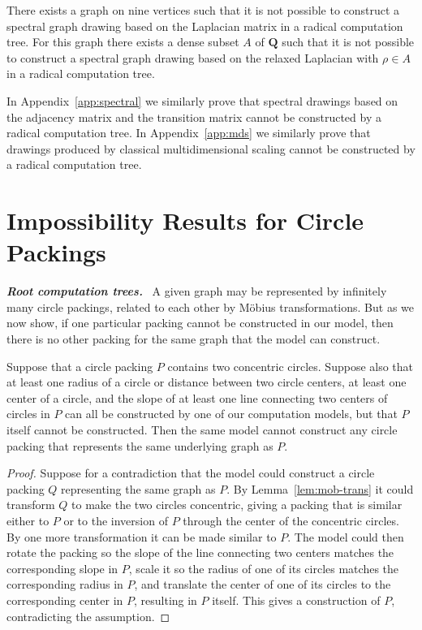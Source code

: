 \documentclass[oribibl,10pt]{llncs}
\newcommand{\rationals}{\mathbf{Q}}
\newcommand{\Emph}[1]{\smallskip\textbf{\textit{#1}}~}
\begin{document}
\begin{theorem}
There exists a graph on nine vertices such that it is not possible to construct a spectral graph drawing based on the Laplacian matrix in a radical computation tree. For this graph there exists a dense subset $A$ of $\rationals$ such that it is not possible to construct a spectral graph drawing based on the relaxed Laplacian with $\rho \in A$ in a radical computation tree.
\end{theorem}

In Appendix~\ref{app:spectral} we similarly prove that spectral drawings based on the adjacency matrix and the transition matrix cannot be constructed by a radical computation tree.  In Appendix~\ref{app:mds} we similarly prove that drawings produced by classical multidimensional scaling cannot be constructed by a radical computation tree.
\section{Impossibility Results for Circle Packings}

\Emph{Root computation trees.} A given graph may be represented by infinitely many circle packings, related to each other by M\"obius transformations. But as we now show, if one particular packing cannot be constructed in our model, then there is no other packing for the same graph that the model can construct.

\begin{lemma}
\label{lem:concentric}
Suppose that a circle packing $P$ contains two concentric circles. Suppose also that at least one radius of a circle or distance between two circle centers, at least one center of a circle, and the slope of at least one line connecting two centers of circles in $P$ can all be constructed by one of our computation models, but that $P$ itself cannot be constructed. Then the same model cannot construct any circle packing that represents the same underlying graph as $P$.
\end{lemma}

\begin{proof}
Suppose for a contradiction that the model could construct a circle packing $Q$ representing the same graph as $P$. By Lemma~\ref{lem:mob-trans} it could transform $Q$ to make the two circles concentric, giving a packing that is similar either to $P$ or to the inversion of $P$ through the center of the concentric circles. By one more transformation it can be made similar to $P$. The model could then rotate the packing so the slope of the line connecting two centers matches the corresponding slope in $P$, scale it so the radius of one of its circles matches the corresponding radius in $P$, and translate  the center of one of its circles to the corresponding center in $P$, resulting in $P$ itself. This gives a construction of $P$, contradicting the assumption.
\end{proof}
\end{document}
